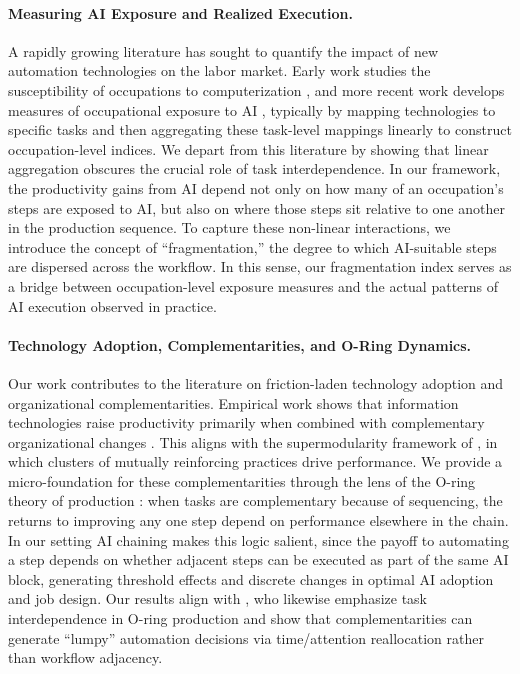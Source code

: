 \paragraph{Measuring AI Exposure and Realized Execution.}
A rapidly growing literature has sought to quantify the impact of new automation technologies on the labor market.
Early work studies the susceptibility of occupations to computerization \citep{frey2017future}, and more recent work develops measures of occupational exposure to AI \citep{brynjolfsson2018can, webb2020impact, felten2021occupational, eloundou2023gpts, hampole2025artificial, tomlinson2025working}, typically by mapping technologies to specific tasks and then aggregating these task-level mappings linearly to construct occupation-level indices.
We depart from this literature by showing that linear aggregation obscures the crucial role of task interdependence.
In our framework, the productivity gains from AI depend not only on how many of an occupation's steps are exposed to AI, but also on where those steps sit relative to one another in the production sequence.
To capture these non-linear interactions, we introduce the concept of ``fragmentation,'' the degree to which AI-suitable steps are dispersed across the workflow.
In this sense, our fragmentation index serves as a bridge between occupation-level exposure measures and the actual patterns of AI execution observed in practice.


\paragraph{Technology Adoption, Complementarities, and O-Ring Dynamics.}
Our work contributes to the literature on friction-laden technology adoption and organizational complementarities.
Empirical work shows that information technologies raise productivity primarily when combined with complementary organizational changes \citep{bresnahan2002information, bloom2016management}.
This aligns with the supermodularity framework of \cite{milgrom1990economics, milgrom1995complementarities}, in which clusters of mutually reinforcing practices drive performance.
We provide a micro-foundation for these complementarities through the lens of the O-ring theory of production \citep{kremer1993oring}: when tasks are complementary because of sequencing, the returns to improving any one step depend on performance elsewhere in the chain.
In our setting AI chaining makes this logic salient, since the payoff to automating a step depends on whether adjacent steps can be executed as part of the same AI block, generating threshold effects and discrete changes in optimal AI adoption and job design.
Our results align with \citet{gans2026oring}, who likewise emphasize task interdependence in O-ring production and show that complementarities can generate ``lumpy'' automation decisions via time/attention reallocation rather than workflow adjacency.

